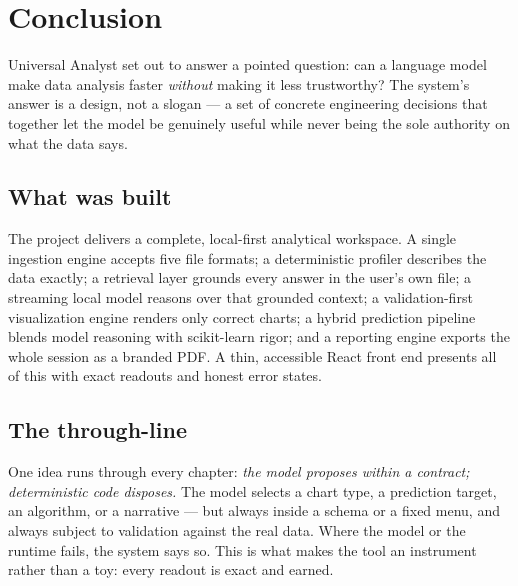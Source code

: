 \chapter{Conclusion}
\label{ch:conclusion}

Universal Analyst set out to answer a pointed question: can a language model make
data analysis faster \emph{without} making it less trustworthy? The system's
answer is a design, not a slogan --- a set of concrete engineering decisions
that together let the model be genuinely useful while never being the sole
authority on what the data says.

\section{What was built}
The project delivers a complete, local-first analytical workspace. A single
ingestion engine accepts five file formats; a deterministic profiler describes
the data exactly; a retrieval layer grounds every answer in the user's own file;
a streaming local model reasons over that grounded context; a validation-first
visualization engine renders only correct charts; a hybrid prediction pipeline
blends model reasoning with scikit-learn rigor; and a reporting engine exports
the whole session as a branded PDF. A thin, accessible React front end presents
all of this with exact readouts and honest error states.

\section{The through-line}
One idea runs through every chapter: \emph{the model proposes within a contract;
deterministic code disposes.} The model selects a chart type, a prediction
target, an algorithm, or a narrative --- but always inside a schema or a fixed
menu, and always subject to validation against the real data. Where the model or
the runtime fails, the system says so. This is what makes the tool an instrument
rather than a toy: every readout is exact and earned.

